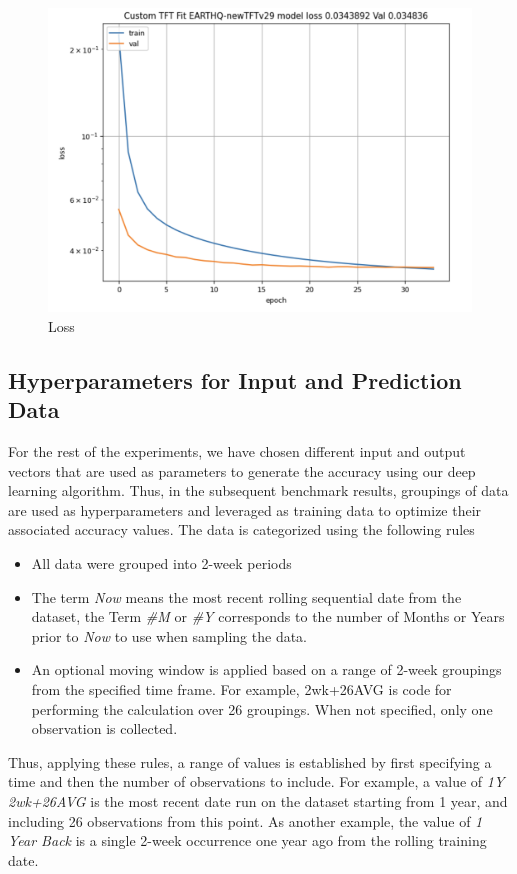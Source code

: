 \documentclass[utf8]{FrontiersinVancouver} %
\begin{document}
{\begin{figure}[htb]
    \centering
    \includegraphics[width=0.70\columnwidth]{images/loss.png}
    \caption{Loss}
    \label{fig:loss}
\end{figure}


\subsection{Hyperparameters for Input and Prediction Data}

For the rest of the experiments, we have chosen different input and
output vectors that are used as parameters to generate the accuracy
using our deep learning algorithm. Thus, in the subsequent benchmark
results, groupings of data are used as hyperparameters and leveraged
as training data to optimize their associated accuracy values. The
data is categorized using the following rules

\begin{itemize}
  \item All data were grouped into 2-week periods
  \item The term {\em Now} means the most recent rolling sequential date from the dataset,
        the Term {\em \#M} or {\em \#Y} corresponds to the number of Months or Years
        prior to {\em Now} to use when sampling the data. 
  \item An optional moving window is applied based on a range of 2-week groupings
        from the specified time frame.  For example, 2wk+26AVG is
        code for performing the calculation over 26 groupings.
        When not specified, only one observation is collected.
\end{itemize}

Thus, applying these rules, a range of values is established by first
specifying a time and then the number of observations to include.  For
example, a value of {\em 1Y 2wk+26AVG} is the most recent date run on the dataset
starting from 1 year, and including 26 observations from this point. As
another example, the value of {\em 1 Year Back} is a single 2-week
occurrence one year ago from the rolling training date.


}
\end{document}
